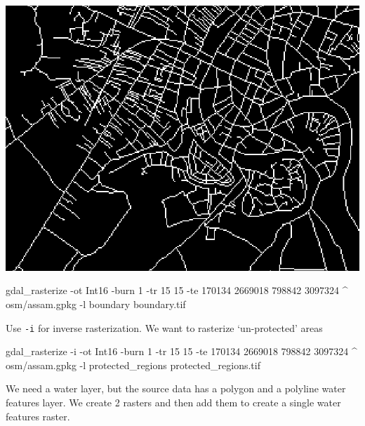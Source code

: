 \documentclass[12pt,a4paper]{article}
\newenvironment{Shaded}{\begin{snugshade}}{\end{snugshade}}
\newcommand{\ExtensionTok}[1]{#1}
\newcommand{\NormalTok}[1]{#1}
\begin{document}
\begin{center}\includegraphics{images/gdal/roads_raster} \end{center}

\begin{Shaded}
\begin{Highlighting}[]
\ExtensionTok{gdal_rasterize}\NormalTok{ -ot Int16 -burn 1 -tr 15 15 -te 170134 2669018 798842 3097324 ^}
  \ExtensionTok{osm/assam.gpkg}\NormalTok{ -l boundary boundary.tif}
\end{Highlighting}
\end{Shaded}

Use \texttt{-i} for inverse rasterization. We want to rasterize
`un-protected' areas

\begin{Shaded}
\begin{Highlighting}[]
\ExtensionTok{gdal_rasterize}\NormalTok{ -i -ot Int16 -burn 1 -tr 15 15 -te 170134 2669018 798842 3097324 ^}
  \ExtensionTok{osm/assam.gpkg}\NormalTok{ -l protected_regions protected_regions.tif}
\end{Highlighting}
\end{Shaded}

We need a water layer, but the source data has a polygon and a polyline
water features layer. We create 2 rasters and then add them to create a
single water features raster.
\end{document}
